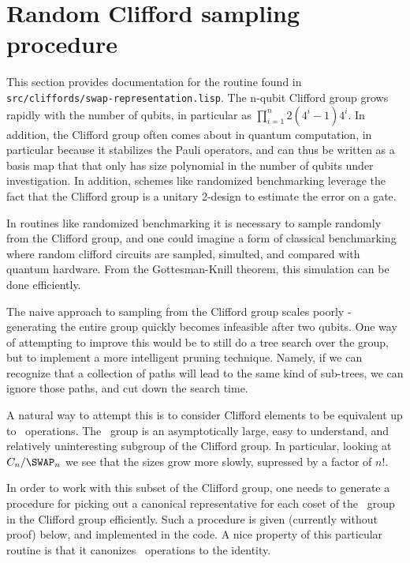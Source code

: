 
\section{Random Clifford sampling procedure}

This section provides documentation for the routine found in \texttt{src/cliffords/swap-representation.lisp}. The n-qubit Clifford group grows rapidly with the number of qubits, in particular as $\prod^n_{i=1} 2(4^i - 1)4^i$. In addition, the Clifford group often comes about in quantum computation, in particular because it stabilizes the Pauli operators, and can thus be written as a basis map that that only has size polynomial in the number of qubits under investigation. In addition, schemes like randomized benchmarking leverage the fact that the Clifford group is a unitary 2-design to estimate the error on a gate.

In routines like randomized benchmarking it is necessary to sample randomly from the Clifford group, and one could imagine a form of classical benchmarking where random clifford circuits are sampled, simulted, and compared with quantum hardware. From the Gottesman-Knill theorem, this simulation can be done efficiently.

The naive approach to sampling from the Clifford group scales poorly - generating the entire group quickly becomes infeasible after two qubits. One way of attempting to improve this would be to still do a tree search over the group, but to implement a more intelligent pruning technique. Namely, if we can recognize that a collection of paths will lead to the same kind of sub-trees, we can ignore those paths, and cut down the search time.

A natural way to attempt this is to consider Clifford elements to be equivalent up to \SWAP\ operations. The \SWAP\ group is an asymptotically large, easy to understand, and relatively uninteresting subgroup of the Clifford group. In particular, looking at $C_n/\SWAP_n$ we see that the sizes grow more slowly, supressed by a factor of $n!$.

In order to work with this subset of the Clifford group, one needs to generate a procedure for picking out a canonical representative for each coset of the \SWAP\ group in the Clifford group efficiently. Such a procedure is given (currently without proof) below, and implemented in the code. A nice property of this particular routine is that it canonizes \SWAP\ operations to the identity.


